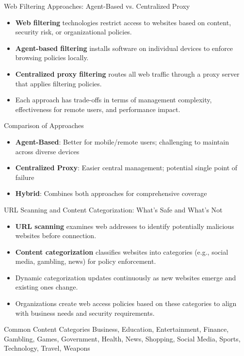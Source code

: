 \documentclass{beamer}
\begin{document}
        \begin{frame}{Web Filtering Approaches: Agent-Based vs. Centralized Proxy}
        \begin{itemize}
            \item \textbf{Web filtering} technologies restrict access to websites based on content, security risk, or organizational policies.
            \item \textbf{Agent-based filtering} installs software on individual devices to enforce browsing policies locally.
            \item \textbf{Centralized proxy filtering} routes all web traffic through a proxy server that applies filtering policies.
            \item Each approach has trade-offs in terms of management complexity, effectiveness for remote users, and performance impact.
        \end{itemize}
        
        \begin{exampleblock}{Comparison of Approaches}
        \begin{itemize}
            \item \textbf{Agent-Based}: Better for mobile/remote users; challenging to maintain across diverse devices
            \item \textbf{Centralized Proxy}: Easier central management; potential single point of failure
            \item \textbf{Hybrid}: Combines both approaches for comprehensive coverage
        \end{itemize}
        \end{exampleblock}
        \end{frame}

        \begin{frame}{URL Scanning and Content Categorization: What's Safe and What's Not}
            \begin{itemize}
                \item \textbf{URL scanning} examines web addresses to identify potentially malicious websites before connection.
                \item \textbf{Content categorization} classifies websites into categories (e.g., social media, gambling, news) for policy enforcement.
                \item Dynamic categorization updates continuously as new websites emerge and existing ones change.
                \item Organizations create web access policies based on these categories to align with business needs and security requirements.
            \end{itemize}
            
            \begin{block}{Common Content Categories}
            Business, Education, Entertainment, Finance, Gambling, Games, Government, Health, News, Shopping, Social Media, Sports, Technology, Travel, Weapons
            \end{block}
            \end{frame}
            
\end{document}
